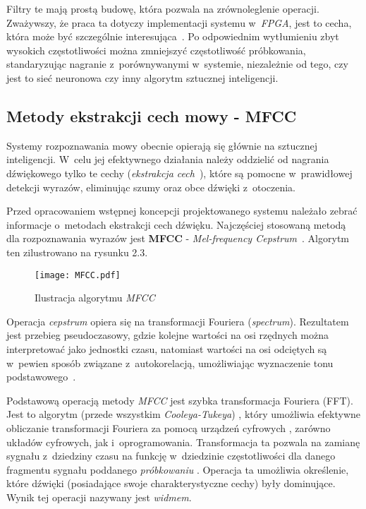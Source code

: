 Filtry te mają prostą budowę, która pozwala na zrównoleglenie operacji. Zważywszy, że praca ta dotyczy implementacji systemu w~\textit{FPGA}, jest to cecha, która może być szczególnie interesująca~\cite{Wiki:FIR}. Po odpowiednim wytłumieniu zbyt wysokich częstotliwości można zmniejszyć częstotliwość próbkowania, standaryzując nagranie z~porównywanymi w~systemie, niezależnie od tego, czy jest to sieć neuronowa czy inny algorytm sztucznej inteligencji.


\subsection{Metody ekstrakcji cech mowy - MFCC}

Systemy rozpoznawania mowy obecnie opierają się głównie na sztucznej inteligencji. W~celu jej efektywnego działania należy oddzielić od nagrania dźwiękowego tylko te cechy (\textit{ekstrakcja cech}~\cite{Ekstrakcja}), które są pomocne w~prawidłowej detekcji wyrazów, eliminując szumy oraz obce dźwięki z~otoczenia.

Przed opracowaniem wstępnej koncepcji projektowanego systemu należało zebrać informacje o~metodach ekstrakcji cech dźwięku. Najczęściej stosowaną metodą dla rozpoznawania wyrazów jest \textbf{MFCC} - \textit{Mel-frequency Cepstrum}~\cite{Wiki:MFCC}.
\newpage
Algorytm ten zilustrowano na rysunku 2.3.

\begin{figure}[h]
	\centering
	\texttt{[image: MFCC.pdf]}
	\caption{Ilustracja algorytmu \textit{MFCC}~\cite{MFCC:Rys}}
\end{figure}
\FloatBarrier %

Operacja \textit{cepstrum} opiera się na transformacji Fouriera (\textit{spectrum}). Rezultatem jest przebieg pseudoczasowy, gdzie kolejne wartości na osi rzędnych można interpretować jako jednostki czasu, natomiast wartości na osi odciętych są w~pewien sposób związane z~autokorelacją, umożliwiając wyznaczenie tonu podstawowego~\cite{APD:PW}.

Podstawową operacją metody \textit{MFCC} jest szybka transformacja Fouriera (FFT). Jest to algorytm (przede wszystkim \textit{Cooleya-Tukeya}) \cite{CT:FFT}, który umożliwia efektywne obliczanie transformacji Fouriera za pomocą urządzeń cyfrowych \cite{Wiki:FFT}, zarówno układów cyfrowych, jak i~oprogramowania. Transformacja ta pozwala na zamianę sygnału z~dziedziny czasu na funkcję w~dziedzinie częstotliwości dla danego fragmentu sygnału poddanego \textit{próbkowaniu} \cite{Agh:Trans}. Operacja ta umożliwia określenie, które dźwięki (posiadające swoje charakterystyczne cechy) były dominujące. Wynik tej operacji nazywany jest \textit{widmem}.

